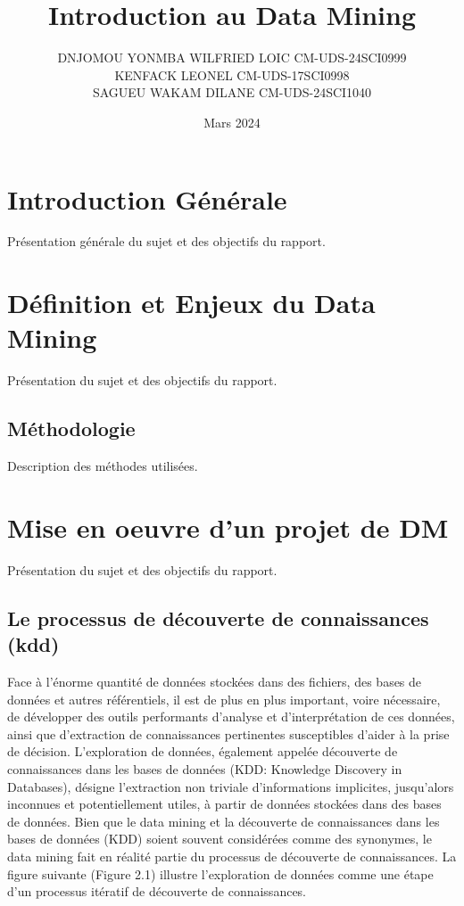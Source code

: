 \documentclass[a4paper,12pt]{report}
\title{ Introduction au Data Mining}
\author{DNJOMOU YONMBA WILFRIED LOIC CM-UDS-24SCI0999 \\
KENFACK LEONEL CM-UDS-17SCI0998\\
SAGUEU WAKAM DILANE CM-UDS-24SCI1040\\}
\date{Mars 2024}
\begin{document}
\maketitle

\tableofcontents

\chapter*{Introduction Générale}
Présentation générale du sujet et des objectifs du rapport.

\chapter{Définition et Enjeux du Data Mining}
Présentation du sujet et des objectifs du rapport.

\section{Méthodologie}
Description des méthodes utilisées.

\chapter{Mise en oeuvre d’un projet de DM}
Présentation du sujet et des objectifs du rapport.

\section{Le processus de découverte de connaissances (kdd)}
Face à l'énorme quantité de données stockées dans des fichiers, des bases de données et autres référentiels, il est de plus en plus important, voire nécessaire, de développer des outils performants d'analyse et d'interprétation de ces données, ainsi que d'extraction de connaissances pertinentes susceptibles d'aider à la prise de décision.
L'exploration de données, également appelée découverte de connaissances dans les bases de données (KDD: Knowledge Discovery in Databases), désigne l'extraction non triviale d'informations implicites, jusqu'alors inconnues et potentiellement utiles, à partir de données stockées dans des bases de données. Bien que le data mining et la découverte de connaissances dans les bases de données (KDD) soient souvent considérées comme des synonymes, le data mining fait en réalité partie du processus de découverte de connaissances. La figure suivante (Figure 2.1) illustre l'exploration de données comme une étape d'un processus itératif de découverte de connaissances.
\end{document}
